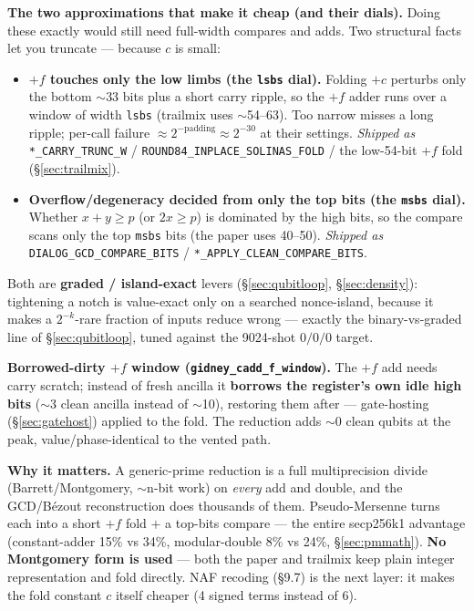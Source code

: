 \documentclass[11pt,a4paper]{article}
\begin{document}
\textbf{The two approximations that make it cheap (and their dials).} Doing these exactly would still
need full-width compares and adds. Two structural facts let you truncate --- because $c$ is small:
\begin{itemize}
  \item \textbf{$+f$ touches only the low limbs (the \texttt{lsbs} dial).} Folding $+c$ perturbs only
    the bottom $\sim$33 bits plus a short carry ripple, so the $+f$ adder runs over a window of width
    \texttt{lsbs} (trailmix uses $\sim$54--63). Too narrow misses a long ripple; per-call failure
    $\approx 2^{-\text{padding}} \approx 2^{-30}$ at their settings. \emph{Shipped as}
    \texttt{*\_CARRY\_TRUNC\_W} / \texttt{ROUND84\_INPLACE\_SOLINAS\_FOLD} / the low-54-bit $+f$ fold
    (\S\ref{sec:trailmix}).
  \item \textbf{Overflow/degeneracy decided from only the top bits (the \texttt{msbs} dial).} Whether
    $x+y \ge p$ (or $2x \ge p$) is dominated by the high bits, so the compare scans only the top
    \texttt{msbs} bits (the paper uses 40--50). \emph{Shipped as} \texttt{DIALOG\_GCD\_COMPARE\_BITS}
    / \texttt{*\_APPLY\_CLEAN\_COMPARE\_BITS}.
\end{itemize}
Both are \textbf{graded / island-exact} levers (\S\ref{sec:qubitloop}, \S\ref{sec:density}):
tightening a notch is value-exact only on a searched nonce-island, because it makes a $2^{-k}$-rare
fraction of inputs reduce wrong --- exactly the binary-vs-graded line of \S\ref{sec:qubitloop}, tuned
against the 9024-shot $0/0/0$ target.

\textbf{Borrowed-dirty $+f$ window (\lstinline{gidney_cadd_f_window}).} The $+f$ add needs carry
scratch; instead of fresh ancilla it \textbf{borrows the register's own idle high bits} ($\sim$3
clean ancilla instead of $\sim$10), restoring them after --- gate-hosting (\S\ref{sec:gatehost})
applied to the fold. The reduction adds $\sim$0 clean qubits at the peak, value/phase-identical to
the vented path.

\textbf{Why it matters.} A generic-prime reduction is a full multiprecision divide
(Barrett/Montgomery, $\sim$n-bit work) on \emph{every} add and double, and the GCD/B\'ezout
reconstruction does thousands of them. Pseudo-Mersenne turns each into a short $+f$ fold $+$ a
top-bits compare --- the entire secp256k1 advantage (constant-adder 15\% vs 34\%, modular-double 8\%
vs 24\%, \S\ref{sec:pmmath}). \textbf{No Montgomery form is used} --- both the paper and trailmix
keep plain integer representation and fold directly. NAF recoding (\S9.7) is the next layer: it makes
the fold constant $c$ itself cheaper (4 signed terms instead of 6).
\end{document}
